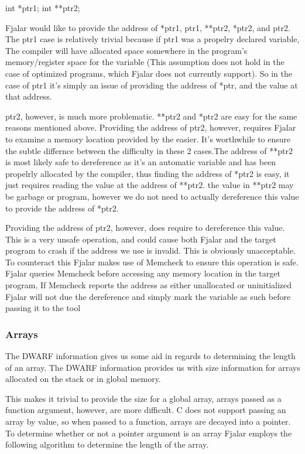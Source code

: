 \documentclass[11pt]{article}
\begin{document}
int *ptr1;
int **ptr2;

Fjalar would like to provide the address of *ptr1, ptr1, **ptr2,
*ptr2, and ptr2. The ptr1 case is relatively trivial because if ptr1
was a propelry declared variable, The compiler will have allocated
space somewhere in the program's memory/register space for the
variable (This assumption does not hold in the case of optimized
programs, which Fjalar does not currently support). So in the case of
ptr1 it's simply an issue of providing the address of *ptr, and the
value at that address.

ptr2, however, is much more problematic. **ptr2 and *ptr2 are easy for
the same reasons mentioned above. Providing the address of ptr2,
however, requires Fjalar to examine a memory location provided by the
easier. It's worthwhile to ensure the subtle differnce between the
difficulty in these 2 cases.The address of **ptr2 is most likely safe
to dereference as it's an automatic variable and has been propelrly
allocated by the compiler, thus finding the address of *ptr2 is easy,
it just requires reading the value at the address of **ptr2. the value
in **ptr2 may be garbage or program, however we do not need to actually
dereference this value to provide the address of *ptr2.

Providing the address of ptr2, however, does require to dereference
this value. This is a very unsafe operation, and could cause both
Fjalar and the target program to crash if the address we use is
invalid. This is obviously unacceptable. To counteract this Fjalar
makes use of Memcheck to ensure this operation is safe. Fjalar queries
Memcheck before accessing any memory location in the target
program, If Memcheck reports the address as either unallocated or
uninitialized Fjalar will not due the dereference and simply mark the
variable as such before passing it to the tool

\subsubsection{Arrays}
The DWARF information gives us some aid in regards to determining the
length of an array. The DWARF information provides us with
size information for arrays allocated on the stack or in global
memory.

This makes it trivial to provide the size for a global array, arrays
passed as a function argument, however, are more difficult. C does not
support passing an array by value, so when passed to a function,
arrays are decayed into a pointer. To determine whether or not a
pointer argument is an array Fjalar employs the following algorithm to
determine the length of the array.
\end{document}
